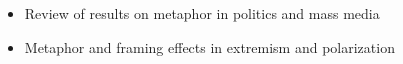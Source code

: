 \documentclass[12pt,letterpaper]{article}
\begin{document}
\begin{itemize}
  \item
    Review of results on metaphor in politics and mass media~\cite{Lakoff1991,Charteris-Black2009,Burnes2011,Flusberg2017,Flusberg2017a,Flusberg2018,Burgers2019}

  \item
    Metaphor and framing effects in extremism and polarization~\cite{Flusberg2017,Flusberg2018,Kalmoe2014,Kalmoe2018}
\end{itemize}




\end{document}
